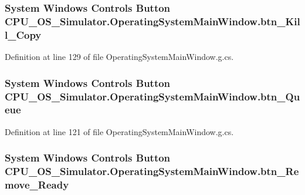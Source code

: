 \subsubsection[{btn\+\_\+\+Kill\+\_\+\+Copy}]{\setlength{\rightskip}{0pt plus 5cm}System Windows Controls Button C\+P\+U\+\_\+\+O\+S\+\_\+\+Simulator.\+Operating\+System\+Main\+Window.\+btn\+\_\+\+Kill\+\_\+\+Copy\hspace{0.3cm}{\ttfamily [package]}}\label{class_c_p_u___o_s___simulator_1_1_operating_system_main_window_a408a9f81462c276937e813344d29fc3c}


Definition at line 129 of file Operating\+System\+Main\+Window.\+g.\+cs.

\hypertarget{class_c_p_u___o_s___simulator_1_1_operating_system_main_window_a241f1be0b04ce501c83e182629a6c694}{}
\subsubsection[{btn\+\_\+\+Queue}]{\setlength{\rightskip}{0pt plus 5cm}System Windows Controls Button C\+P\+U\+\_\+\+O\+S\+\_\+\+Simulator.\+Operating\+System\+Main\+Window.\+btn\+\_\+\+Queue\hspace{0.3cm}{\ttfamily [package]}}\label{class_c_p_u___o_s___simulator_1_1_operating_system_main_window_a241f1be0b04ce501c83e182629a6c694}


Definition at line 121 of file Operating\+System\+Main\+Window.\+g.\+cs.

\hypertarget{class_c_p_u___o_s___simulator_1_1_operating_system_main_window_a4ed06428179b1762e9ac112287e2fbc1}{}
\subsubsection[{btn\+\_\+\+Remove\+\_\+\+Ready}]{\setlength{\rightskip}{0pt plus 5cm}System Windows Controls Button C\+P\+U\+\_\+\+O\+S\+\_\+\+Simulator.\+Operating\+System\+Main\+Window.\+btn\+\_\+\+Remove\+\_\+\+Ready\hspace{0.3cm}{\ttfamily [package]}}\label{class_c_p_u___o_s___simulator_1_1_operating_system_main_window_a4ed06428179b1762e9ac112287e2fbc1}


